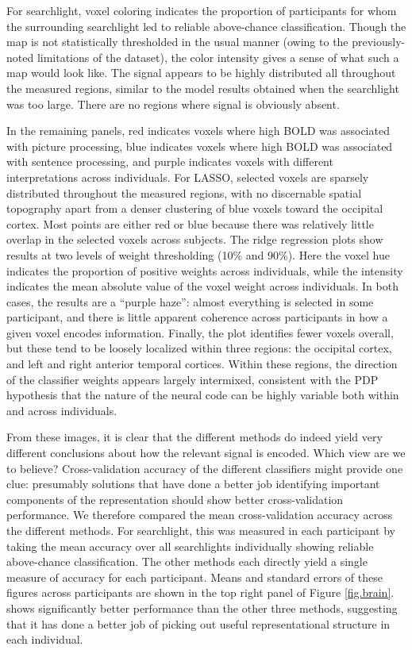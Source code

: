 For searchlight, voxel coloring indicates the proportion of participants for whom the surrounding searchlight led to reliable above-chance classification. Though the map is not statistically thresholded in the usual manner (owing to the previously-noted limitations of the dataset), the color intensity gives a sense of what such a map would look like. The signal appears to be highly distributed all throughout the measured regions, similar to the model results obtained when the searchlight was too large. There are no regions where signal is obviously absent. 

In the remaining panels, red indicates voxels where high BOLD was associated with picture processing, blue indicates voxels where high BOLD was associated with sentence processing, and purple indicates voxels with different interpretations across individuals. For LASSO, selected voxels are sparsely distributed throughout the measured regions, with no discernable spatial topography apart from a denser clustering of blue voxels toward the occipital cortex. Most points are either red or blue because there was relatively little overlap in the selected voxels across subjects. The ridge regression plots show results at two levels of weight thresholding (10\% and 90\%). Here the voxel hue indicates the proportion of positive weights across individuals, while the intensity indicates the mean absolute value of the voxel weight across individuals. In both cases, the results are a ``purple haze'': almost everything is selected in some participant, and there is little apparent coherence across participants in how a given voxel encodes information. Finally, the \soslasso plot identifies fewer voxels overall, but these tend to be loosely localized within three regions: the occipital cortex, and left and right anterior temporal cortices. Within these regions, the direction of the classifier weights appears largely intermixed, consistent with the PDP hypothesis that the nature of the neural code can be highly variable both within and across individuals.

From these images, it is clear that the different methods do indeed yield very different conclusions about how the relevant signal is encoded. Which view are we to believe? Cross-validation accuracy of the different classifiers might provide one clue: presumably solutions that have done a better job identifying important components of the representation should show better cross-validation performance. We therefore compared the mean cross-validation accuracy across the different methods. For searchlight, this was measured in each participant by taking the mean accuracy over all searchlights individually showing reliable above-chance classification. The other methods each directly yield a single measure of accuracy for each participant. Means and standard errors of these figures across participants are shown in the top right panel of Figure \ref{fig.brain}. \soslasso shows significantly better performance than the other three methods, suggesting that it has done a better job of picking out useful representational structure in each individual.

